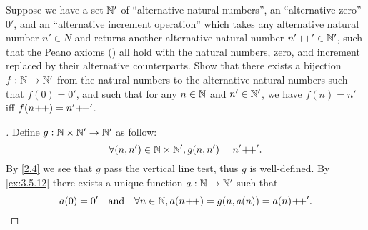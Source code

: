 \begin{ex}\label{ex:3.5.13}
	Suppose we have a set \(\mathbb{N}'\) of ``alternative natural numbers'', an ``alternative zero'' \(0'\), and an ``alternative increment operation'' which takes any alternative natural number \(n' \in N\) and returns another alternative natural number \(n'\!+\!\!+' \in \mathbb{N}'\), such that the Peano axioms () all hold with the natural numbers, zero, and increment replaced by their alternative counterparts.
	Show that there exists a bijection \(f : \mathbb{N} \to \mathbb{N}'\) from the natural numbers to the alternative natural numbers such that \(f(0) = 0'\), and such that for any \(n \in \mathbb{N}\) and \(n' \in \mathbb{N}'\), we have \(f(n) = n'\) iff \(f(n\!+\!\!+) = n'\!+\!\!+'\).
\end{ex}

\begin{proof}[]
	Define \(g : \mathbb{N} \times \mathbb{N}' \to \mathbb{N}'\) as follow:
	\[
		\forall (n, n') \in \mathbb{N} \times \mathbb{N}', g(n, n') = n'\!+\!\!+'.
	\]
	By \cref{2.4} we see that \(g\) pass the vertical line test, thus \(g\) is well-defined.
	By \cref{ex:3.5.12} there exists a unique function \(a : \mathbb{N} \to \mathbb{N}'\) such that
	\[
		a(0) = 0' \quad \text{and} \quad \forall n \in \mathbb{N}, a(n\!+\!\!+) = g(n, a(n)) = a(n)\!+\!\!+'.
	\]


\end{proof}
